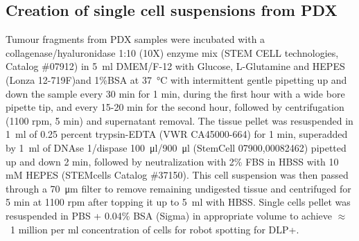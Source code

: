 \subsection{Creation of single cell suspensions from PDX}
Tumour fragments from PDX samples were incubated with a collagenase/hyaluronidase 1:10 (10X) enzyme mix (STEM CELL technologies, Catalog \#07912) in  \SI{5}{\ml} DMEM/F-12 with Glucose, L-Glutamine and HEPES (Lonza 12-719F)and 1\%BSA at \SI{37}{\degreeCelsius} with intermittent gentle pipetting up and down the sample every 30 min for 1 min, during the first hour with a wide bore pipette tip, and every 15-20 min for the second hour, followed by  centrifugation (1100 rpm, 5 min) and supernatant removal.
The tissue pellet was resuspended in \SI{1}{\ml} of  0.25 percent trypsin-EDTA (VWR CA45000-664) for 1 min, superadded by \SI{1}{\ml} of DNAse 1/dispase \SI{100}{\ul}/\SI{900}{\ul} (StemCell 07900,00082462) pipetted up and down 2 min, followed by neutralization with 2\% FBS in HBSS with 10 mM HEPES (STEMcells Catalog \#37150). 
This cell suspension was then passed through a \SI{70}{\micro\metre} filter to remove remaining undigested tissue and centrifuged for 5 min at 1100 rpm after topping it up to \SI{5}{\ml} with HBSS.
Single cells pellet  was resuspended in PBS + 0.04\% BSA (Sigma) in appropriate volume to achieve  $\approx$~1 million per ml concentration of cells for robot spotting for DLP+.

